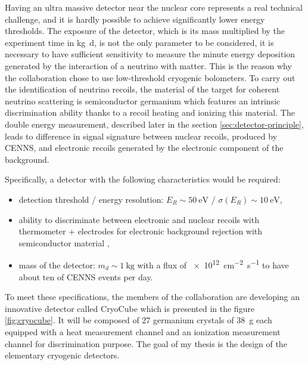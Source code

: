 Having an ultra massive detector near the nuclear core represents a real technical challenge, and it is hardly possible to achieve significantly lower energy thresholds.
The exposure of the detector, which is its mass multiplied by the experiment time in \si{\kg \day}, is not the only parameter to be considered, it is necessary to have sufficient sensitivity to measure the minute energy deposition generated by the interaction of a neutrino with matter. This is the reason why the \Ricochet{} collaboration chose to use low-threshold cryogenic bolometers.
To carry out the identification of neutrino recoils, the material of the target for coherent neutrino scattering is semiconductor germanium which features an intrinsic discrimination ability thanks to a recoil heating and ionizing this material. The double energy measurement, described later in the section \ref{sec:detector-principle}, leads to difference in signal signature between nuclear recoils, produced by CENNS, and electronic recoils generated by the electronic component of the background.


Specifically, a detector with the following characteristics would be required:
\begin{itemize}
	\item detection threshold / energy resolution: $E_R \sim \SI{50}{\eV}$ / $\sigma(E_R) \sim \SI{10}{\eV}$,
	\item ability to discriminate between electronic and nuclear recoils with thermometer + electrodes for electronic background rejection with semiconductor material ,
	\item mass of the detector: $m_d \sim \SI{1}{\kg}$ with a flux of \SI{e12}{\cm^{-2} \s^{-1}} to have about ten of CENNS events per day.
\end{itemize}

To meet these specifications, the members of the \Ricochet{} collaboration are developing an innovative detector called CryoCube which is presented in the figure \ref{fig:cryocube}. It will be composed of 27 germanium crystals of \SI{38}{\g} each equipped with a heat measurement channel and an ionization measurement channel for discrimination purpose. The goal of my thesis is the design of the elementary cryogenic detectors.

